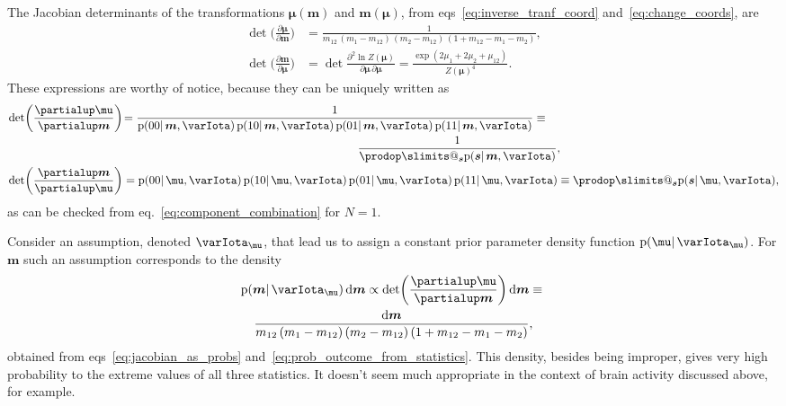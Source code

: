 \documentclass[\ifafour a4paper,12pt,\else a5paper,10pt,\fi%
onecolumn,oneside,article,%
british%
]{memoir}
\makeatletter
\theoremstyle{remark}
\theoremstyle{innote}
\def\prod{\DOTSI\prodop\slimits@}
\newcommand*{\de}{\partialup}%
\newcommand*{\di}{\mathrm{d}}%
\newcommand*{\pf}{\mathrm{p}}%
\renewcommand*{\|}{\mathpunct{|}}
\newcommand*{\eqn}{eq.}%
\newcommand*{\eqns}{eqs}%
\newcommand*{\yI}{\varIota}
\newcommand*{\ys}{\bm{s}}
\newcommand*{\la}{\mu_{12}}
\newcommand*{\yth}{\bm{\mu}}
\newcommand*{\yt}{\bm{m}}
\newcommand*{\yl}{m_{12}}
\newcommand*{\yIth}{\yI_{\yth}}
\makeatother
\begin{document}
The Jacobian determinants of the transformations $\yth(\yt)$ and $\yt(\yth)$, from
\eqns~\eqref{eq:inverse_tranf_coord} and~\eqref{eq:change_coords}, are
\begin{subequations}  \label{eq:jacobian_transf}
  \begin{align}
    \det\biggl( \frac{\de\yth}{\de\yt}\biggr)
    &= \frac{1}{\yl\,(m_1-\yl)\,(m_2-\yl)\,(1+\yl-m_1-m_2)},
    \\
    \det\biggl( \frac{\de\yt}{\de\yth}\biggr)
    &=
\det\frac{\de^2\ln Z(\yth)}{\de\yth\,\de\yth}
=
      \frac{\exp(2\mu_1 + 2\mu_2 + \la)}{Z(\yth)^4}.
  \end{align}
\end{subequations}
These expressions are worthy of notice, because they can be uniquely written
as
\begin{subequations}    \label{eq:jacobian_as_probs}
  \begin{align}
    \det\biggl( \frac{\de\yth}{\de\yt}\biggr)
    &\!\!
      \begin{multlined}[t][0.85\linewidth]
=\frac{1}{
      \pf(00 \|\yt,\yI)\,
      \pf(10 \|\yt,\yI)\,
      \pf(01 \|\yt,\yI)\,
      \pf(11 \|\yt,\yI)}
      \equiv{}\\ \frac{1}{\prod_{\ys}\pf(\ys \|\yt,\yI)},
    \end{multlined}
      \\
      \det\biggl( \frac{\de\yt}{\de\yth}\biggr)
    &=
      \pf(00 \|\yth,\yI)\,
      \pf(10 \|\yth,\yI)\,
      \pf(01 \|\yth,\yI)\,
      \pf(11 \|\yth,\yI)
      \equiv \prod_{\ys}\pf(\ys \|\yth,\yI),
  \end{align}
\end{subequations}
as can be checked from \eqn~\eqref{eq:component_combination} for $N=1$.

Consider an assumption, denoted $\yIth$, that lead us to assign a constant
prior parameter density function $\pf(\yth \|\yIth)$. For $\yt$ such an
assumption corresponds to the density
\begin{multline}
  \label{eq:flat_density_in_statistics_space}
  \pf(\yt \|\yIth)\,\di\yt \propto
  \det\biggl( \frac{\de\yth}{\de\yt}\biggr)\,\di\yt
  \equiv{}\\
  \frac{\di\yt}{\yl\,(m_1-\yl)\,(m_2-\yl)\,(1+\yl-m_1-m_2)},
\end{multline}
obtained from \eqns~\eqref{eq:jacobian_as_probs}
and~\eqref{eq:prob_outcome_from_statistics}. This density, besides being
improper, gives very high probability to the extreme values of all three
statistics. It doesn't seem much appropriate in the context of brain
activity discussed above, for example.
\end{document}
